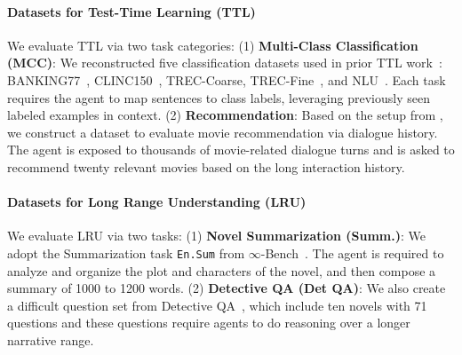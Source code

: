 \vspace{-8pt}

\paragraph{Datasets for Test-Time Learning (TTL)}
We evaluate TTL via two task categories: (1) \textbf{Multi-Class Classification (MCC)}: We reconstructed five classification datasets used in prior TTL work~\citep{icl,HELMET}: BANKING77~\citep{banking77}, CLINC150~\citep{clinic150}, TREC-Coarse, TREC-Fine~\citep{trec}, and NLU~\citep{nlu}. Each task requires the agent to map sentences to class labels, leveraging previously seen labeled examples in context. (2) \textbf{Recommendation}: Based on the setup from \citep{redial, LLM_Zeroshot_Recsys}, we construct a dataset to evaluate movie recommendation via dialogue history. The agent is exposed to thousands of movie-related dialogue turns and is asked to recommend twenty relevant movies based on the long interaction history.

\vspace{-8pt}
\paragraph{Datasets for Long Range Understanding (LRU)} We evaluate LRU via two tasks: (1) \textbf{Novel Summarization (Summ.)}: We adopt the Summarization task \texttt{En.Sum} from $\infty$-Bench~\citep{infinitebench}. The agent is required to analyze and organize the plot and characters of the novel, and then compose a summary of 1000 to 1200 words. (2) \textbf{Detective QA (Det QA)}: We also create a difficult question set from Detective QA~\citep{detectiveqa}, which include ten novels with 71 questions and these questions require agents to do reasoning over a longer narrative range.

\vspace{-8pt}
